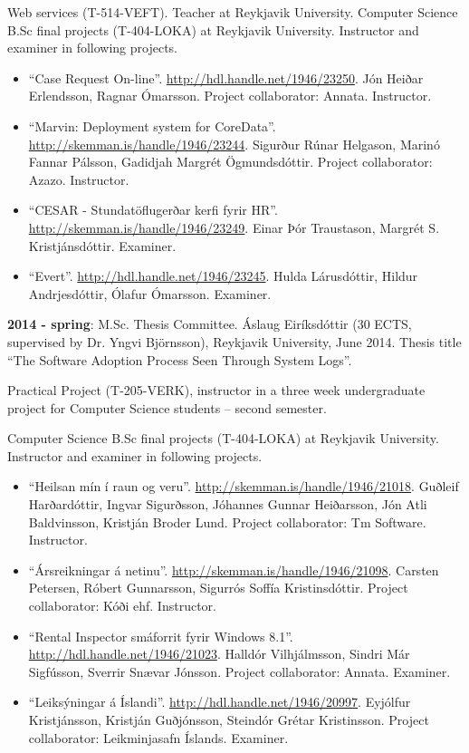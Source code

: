 Web services (T-514-VEFT). Teacher at Reykjavik University. Computer Science B.Sc final projects (T-404-LOKA) at Reykjavik University. Instructor and examiner in following projects.

\begin{itemize}
\item ``Case Request On-line''. \url{http://hdl.handle.net/1946/23250}. Jón Heiðar Erlendsson, Ragnar Ómarsson. Project collaborator: Annata. Instructor.

\item ``Marvin: Deployment system for CoreData''. \url{http://skemman.is/handle/1946/23244}. Sigurður Rúnar Helgason, Marinó Fannar Pálsson, Gadidjah Margrét Ögmundsdóttir. Project collaborator: Azazo. Instructor.

\item ``CESAR - Stundatöflugerðar kerfi fyrir HR''. \url{http://skemman.is/handle/1946/23249}. Einar Þór Traustason, Margrét S. Kristjánsdóttir. Examiner. 

\item ``Evert''. \url{http://hdl.handle.net/1946/23245}. Hulda Lárusdóttir, Hildur Andrjesdóttir, Ólafur Ómarsson. Examiner.
\end{itemize}

\textbf{2014 - spring}:
M.Sc. Thesis Committee. Áslaug Eiríksdóttir (30 ECTS, supervised by Dr. Yngvi
Björnsson), Reykjavik University, June 2014. Thesis title ``The Software
Adoption Process Seen Through System Logs''.

Practical Project (T-205-VERK), instructor in a three week undergraduate project for Computer Science students -- second semester.

Computer Science B.Sc final projects (T-404-LOKA) at Reykjavik University. Instructor and examiner in following projects.

\begin{itemize}
\item
``Heilsan mín í raun og veru''. \url{http://skemman.is/handle/1946/21018}. Guðleif Harðardóttir, Ingvar Sigurðsson, Jóhannes Gunnar Heiðarsson, Jón Atli Baldvinsson, Kristján Broder Lund. Project collaborator: Tm Software. Instructor.

\item
``Ársreikningar á netinu''. \url{http://skemman.is/handle/1946/21098}. Carsten Petersen, Róbert Gunnarsson, Sigurrós Soffía Kristinsdóttir. Project collaborator: Kóði ehf. Instructor. 

\item
``Rental Inspector smáforrit fyrir Windows 8.1''. \url{http://hdl.handle.net/1946/21023}. Halldór Vilhjálmsson, Sindri Már Sigfússon, Sverrir Snævar Jónsson. Project collaborator: Annata. Examiner.

\item
``Leiksýningar á Íslandi''. \url{http://hdl.handle.net/1946/20997}. Eyjólfur Kristjánsson, Kristján Guðjónsson, Steindór Grétar Kristinsson. Project collaborator: Leikminjasafn Íslands. Examiner.
\end{itemize}



